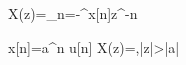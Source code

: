 X(z)=\sum_{n=-\infty}^{\infty}x[n]z^{-n}

x[n]=a^n u[n] \quad\Longrightarrow\quad X(z)=,\quad |z|>|a|
